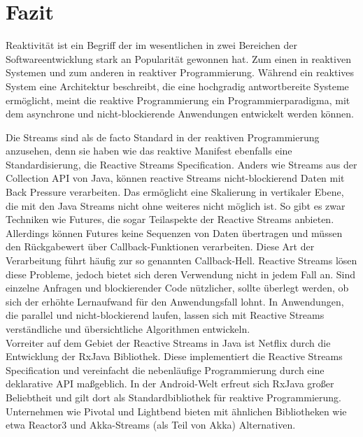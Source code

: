 \chapter{Fazit}
\label{chap:fazit}
Reaktivität ist ein Begriff der im wesentlichen in zwei Bereichen der Softwareentwicklung stark an Popularität gewonnen hat. Zum einen in reaktiven Systemen und zum anderen in reaktiver Programmierung. Während ein reaktives System eine Architektur beschreibt, die eine hochgradig antwortbereite Systeme ermöglicht, meint die reaktive Programmierung ein Programmierparadigma, mit dem asynchrone und nicht-blockierende Anwendungen entwickelt werden können. 

Die Streams sind als de facto Standard in der reaktiven Programmierung anzusehen, denn sie haben wie das reaktive Manifest ebenfalls eine Standardisierung, die Reactive Streams Specification. Anders wie Streams aus der Collection API von Java, können reactive Streams nicht-blockierend Daten mit Back Pressure verarbeiten. Das ermöglicht eine Skalierung in vertikaler Ebene, die mit den Java Streams nicht ohne weiteres nicht möglich ist. So gibt es zwar Techniken wie Futures, die sogar Teilaspekte der Reactive Streams anbieten. Allerdings können Futures keine Sequenzen von Daten übertragen und müssen den Rückgabewert über Callback-Funktionen verarbeiten. Diese Art der Verarbeitung führt häufig zur so genannten Callback-Hell. Reactive Streams lösen diese Probleme, jedoch bietet sich deren Verwendung nicht in jedem Fall an. Sind einzelne Anfragen und blockierender Code nützlicher, sollte überlegt werden, ob sich der erhöhte Lernaufwand für den Anwendungsfall lohnt. In Anwendungen, die parallel und nicht-blockierend laufen, lassen sich mit Reactive Streams verständliche und übersichtliche Algorithmen entwickeln. \\

Vorreiter auf dem Gebiet der Reactive Streams in Java ist Netflix durch die Entwicklung der RxJava Bibliothek. Diese implementiert die Reactive Streams Specification und vereinfacht die nebenläufige Programmierung durch eine deklarative API maßgeblich. In der Android-Welt erfreut sich RxJava großer Beliebtheit und gilt dort als Standardbibliothek für reaktive Programmierung. Unternehmen wie Pivotal und Lightbend bieten mit ähnlichen Bibliotheken wie etwa Reactor3 und Akka-Streams (als Teil von Akka) Alternativen. \\

